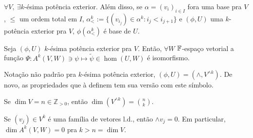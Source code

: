 \begin{theorem}
    \label{thm:1042}
    \(\forall V, \ \exists k\)-ésima potência exterior. Além disso, se \(\alpha = (v_i)_{i\in I}\) fora uma base pra \(V\), \(\leq\) um ordem total em \(I\), \(\alpha^k_< := \{(v_{i_j}) \in \alpha^k: i_j < i_{j+1}\}\) e \((\phi,U)\) uma $k$-potência exterior pra \(V\), \(\phi(\alpha^k_<)\) é base de \(U\).   
\end{theorem}


\begin{theorem}
    \label{thm:1043}
    Seja \((\phi, U)\) $k$-ésima potência exterior pra \(V\). Então, \(\forall W\) \(\mathbb{F}\)-espaço vetorial a função \(\Psi: A^k(V,W) \ni \psi \mapsto \widetilde{\psi} \in \hom(U,W)\) é isomorfismo. 
\end{theorem}

\begin{note}
    Notação não padrão pra $k$-ésima potência exterior, \((\phi, U) = (\wedge,  V^{\wedge k})\). De novo, as propriedades que à definem tem sua versão com este símbolo.  
\end{note}

\begin{corollary}
    Se \(\dim V = n \in \mathbb{Z}_{>0}\), então \(\dim (V^{\wedge k}) = \binom{n}{k}\). %
\end{corollary}

\begin{exercise}
    Se \((v_j) \in  V^k\) é uma família de vetores l.d., então \(\wedge v_j = 0\). Em particular, \(\dim A^k(V,W) = 0\) pra \(k >  n = \dim V\).   
\end{exercise}

